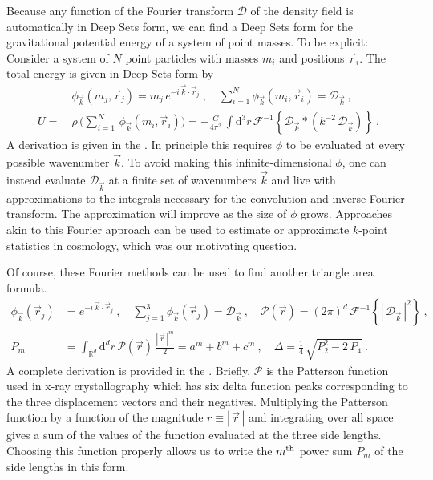 \documentclass[10pt]{article}
\renewcommand{\d}{\mathrm{d}}
\newcommand{\abs}[1]{|\,{#1}\,|}
\begin{document}
Because any function of the Fourier transform $\mathcal{D}$ of the density field is automatically in Deep Sets form,
we can find a Deep Sets form for the gravitational potential energy of a system of point masses.
To be explicit: Consider a system of $N$ point particles with masses $m_i$ and positions $\vec{r}_i$.
The total energy is given in Deep Sets form by
\begin{align}
    &\phi_{\vec{k}}(m_j, \vec{r}_j)
    =m_j \, e^{-i \, \vec{k} \cdot \vec{r}_j}
    ~,
    \quad
    \sum_{i=1}^{N} \phi_{\vec{k}}(m_i, \vec{r}_i)
    = \mathcal{D}_{\vec{k}}~,
    \nonumber\\
    U = \ &\rho \, \big( \sum_{i=1}^{N} \, \phi_{\vec{k}}(m_i, \vec{r}_i) \big)
    = -\frac{G}{4 \pi^2} \,
        \int \d^3 r \,
        \mathcal{F}^{-1}\!\left\{
            \mathcal{D}_{\vec{k}} \ast \left(
            k^{-2} \, \mathcal{D}_{\vec{k}} \right)
        \right\}~.
    \label{eq:EnergyDeepSets}
\end{align}
A derivation is given in the .
In principle this requires $\phi$ to be evaluated at every possible wavenumber $\vec{k}$.
To avoid making this infinite-dimensional $\phi$, one can instead evaluate $\mathcal{D}_{\vec{k}}$ at a finite set of wavenumbers $\vec{k}$ and live with approximations to the integrals necessary for the convolution and inverse Fourier transform.
The approximation will improve as the size of $\phi$ grows.
Approaches akin to this Fourier approach can be used \citep[and are used; e.g.,][]{Portillo+2018,Philcox+2022ENCORE} to estimate or approximate $k$-point statistics in cosmology, which was our motivating question.

Of course, these Fourier methods can be used to find another triangle area formula.
\begin{align}
    \phi_{\vec{k}} (\vec{r}_j) &= e^{-i \, \vec{k} \cdot \vec{r}_j}~,
    \quad
    \sum_{j=1}^{3} \phi_{\vec{k}}(\vec{r}_j) = \mathcal{D}_{\vec{k}}~,
    \quad
    \mathcal{P}(\vec{r}) = (2\pi)^d \, \mathcal{F}^{-1}\!\left\{
    \abs{ \mathcal{D}_{\vec{k}} }^2 \right\}~,
    \nonumber\\
    P_m &= \int_{\mathbb{R}^d} \d^d r \, \mathcal{P}(\vec{r}) \, \frac{\abs{\vec{r}}^m}{2}
    = a^m+b^m+c^m
    ~,
    \quad
    \Delta
    = \frac{1}{4} \, \sqrt{P_2^2 - 2 \, P_4}~.
    \label{eq:Fresult}
\end{align}
A complete derivation is provided in the .
Briefly, $\mathcal{P}$ is the Patterson function used in x-ray crystallography \citep{Patterson1934} which has six delta function peaks corresponding to the three displacement vectors and their negatives.
Multiplying the Patterson function by a function of the magnitude $r \equiv \abs{\vec{r}}$ and integrating over all space gives a sum of the values of the function evaluated at the three side lengths. 
Choosing this function properly allows us to write the $m^{\rm th}$ power sum $P_m$ of the side lengths in this form.
\end{document}
